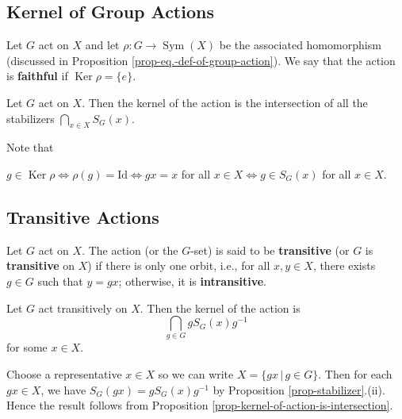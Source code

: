 \begin{remark}
\subsection{Kernel of Group Actions}
\begin{definition}
	Let $G$ act on $X$ and let $\rho:G\rightarrow \operatorname{Sym}(X)$ be the associated homomorphism (discussed in Proposition \ref{prop-eq.-def-of-group-action}). We say that the action is \textbf{faithful} if $\operatorname{Ker} \rho = \{e\}$.
\end{definition}
\begin{proposition} \label{prop-kernel-of-action-is-intersection}
	Let $G$ act on $X$. Then the kernel of the action is the intersection of all the stabilizers $\bigcap_{x\in X}S_G(x)$.
\end{proposition}
\begin{sketch}
	Note that 
	\begin{center}
		$g\in \operatorname{Ker} \rho \iff \rho(g) = \text{Id} \iff gx = x$ for all $x\in X\iff g\in S_G(x)$ for all $x\in X$.
	\end{center} 
\end{sketch}

\subsection{Transitive Actions}
\begin{definition}
	Let $G$ act on $X$. The action (or the $G$-set) is said to be \textbf{transitive} (or $G$ is \textbf{transitive} on $X$) if there is only one orbit, i.e., for all $x,y\in X$, there exists $g\in G$ such that $y = gx$; otherwise, it is \textbf{intransitive}.
\end{definition}
\begin{proposition} \label{prop-kernel-of-transitive-action}
	Let $G$ act transitively on $X$. Then the kernel of the action is 
	\begin{equation*}
		\bigcap_{g\in G} gS_G(x)g^{-1}
	\end{equation*}
	for some $x\in X$.
\end{proposition}
\begin{sketch}
	Choose a representative $x\in X$ so we can write $X=\{gx\,|\, g\in G\}$. Then for each $gx\in X$, we have  $S_G(gx) = gS_G(x)g^{-1}$ by Proposition \ref{prop-stabilizer}.(ii). Hence the result follows from Proposition \ref{prop-kernel-of-action-is-intersection}.
\end{sketch}


\end{remark}
